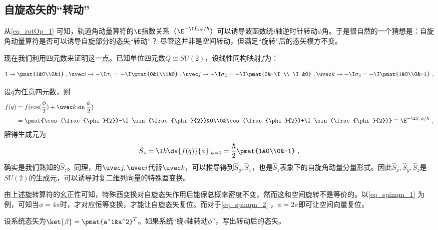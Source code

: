 \subsection{自旋态矢的“转动”}
从\autoref{eq_rotOp_1} 可知，轨道角动量算符的$\E$指数关系（$\E^{-\I \hat L_i\phi/\hbar}$）可以诱导波函数绕$i$轴逆时针转动$\phi$角。于是很自然的一个猜想是：自旋角动量算符是否可以诱导自旋部分的态矢“转动”？ 尽管这并非是空间转动，但满足“旋转”后的态矢模方不变。

现在我们利用四元数来证明这一点。已知单位四元数$Q\cong SU(2)$，设线性同构映射$f$为：

\begin{equation}
1\rightarrow\pmat{1&0\\0&1}~,\uvec i\rightarrow-\I\sigma_1=-\I\pmat{0&1\\1&0}~,\uvec j\rightarrow -\I\sigma_2=-\I\pmat{0&-\I\\ \I&0}~,\uvec k\rightarrow -\I\sigma_3=-\I\pmat{1&0\\0&-1}~.
\end{equation}

设$q$为任意四元数，则
\begin{equation}\label{eq_spinqm_1}
\begin{aligned}
f(q)&=f(\cos(\frac{\phi}{2})+\uvec k \sin\frac{\phi}{2})\\
&=\pmat{\cos(\frac{\phi}{2})-\I \sin (\frac{\phi}{2})&0\\0&\cos(\frac{\phi}{2})+\I\sin (\frac{\phi}{2})}\equiv\E^{-\I \hat S_z \phi /\hbar}~,
\end{aligned}
\end{equation}
解得生成元为
\begin{equation}
\hat S_z=\I\hbar \dv{f(q)}{\phi}|_{\phi=0}=\frac{\hbar}{2}\pmat{1&0\\0&-1}~,
\end{equation}
确实是我们熟知的$\hat S_z$。同理，用$\uvec j,\uvec i$代替$\uvec k$，可以推导得到$\hat S_y,\hat S_x$，也是$\hat S_z$表象下的自旋角动量分量形式。因此$\hat S_x,\hat S_y,\hat S_z$是$SU(2)$的生成元，可以诱导对复二维列向量的特殊酉变换。

由上述旋转算符的幺正性可知，特殊酉变换对自旋态矢作用后能保总概率密度不变，然而这和空间旋转不是等价的。以\autoref{eq_spinqm_1} 为例，可知当$\phi=4\pi$时，才对应恒等变换，才能让自旋态矢复位。而对于\autoref{eq_spinqm_2} ，$\phi=2\pi$即可让空间向量复位。
\begin{exercise}{}
设系统态矢为$\ket{\beta}=\pmat{a^1&a^2}^T$。如果系统“绕$z$轴转动$\phi$”，写出转动后的态矢。
\end{exercise}
